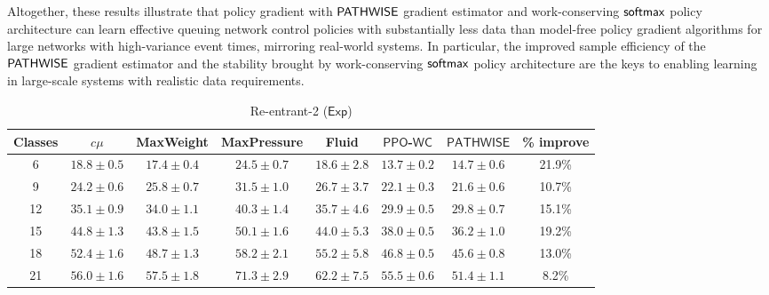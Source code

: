Altogether, these results illustrate that policy gradient with $\mathsf{PATHWISE}$ gradient estimator and work-conserving $\mathop{\mathsf{softmax}}$ policy architecture can learn effective queuing network control policies with substantially less data than model-free policy gradient algorithms for large networks with high-variance event times, mirroring real-world systems. 
In particular, the improved sample efficiency of the $\mathsf{PATHWISE}$ gradient estimator and the stability brought by work-conserving $\mathop{\mathsf{softmax}}$ policy architecture are the keys to enabling learning in large-scale systems with realistic data requirements.



\begin{table}[h!]
\centering
 \caption{Re-entrant-2 ($\mathsf{Exp}$)}%
\begin{tabular}{cccccccc}
\toprule 
{\footnotesize{}Classes} & {\footnotesize{}$c\mu$ } & {\footnotesize{}MaxWeight } & {\footnotesize{}MaxPressure} & {\footnotesize{}Fluid } & {\footnotesize{}$\mathsf{PPO}$-$\mathsf{WC}$ } & {\footnotesize{}$\mathsf{PATHWISE}$} & {\footnotesize{}\% improve}\tabularnewline
\midrule 
{\footnotesize{}6} & {\footnotesize{}$18.8\pm0.5$} & {\footnotesize{}$17.4\pm0.4$} & {\footnotesize{}$24.5\pm0.7$} & {\footnotesize{}$18.6\pm2.8$} & {\footnotesize{}$\mathbf{13.7\pm0.2}$} & {\footnotesize{}$14.7\pm0.6$} & {\footnotesize{}21.9\%}\tabularnewline
\midrule 
{\footnotesize{}9} & {\footnotesize{}$24.2\pm0.6$} & {\footnotesize{}$25.8\pm0.7$} & {\footnotesize{}$31.5\pm1.0$} & {\footnotesize{}$26.7\pm3.7$} & {\footnotesize{}$\mathbf{22.1\pm0.3}$} & {\footnotesize{}$\mathbf{21.6\pm0.6}$} & {\footnotesize{}10.7\%}\tabularnewline
\midrule 
{\footnotesize{}12 } & {\footnotesize{}$35.1\pm0.9$} & {\footnotesize{}$34.0\pm1.1$} & {\footnotesize{}$40.3\pm1.4$} & {\footnotesize{}$35.7\pm4.6$} & {\footnotesize{}$\mathbf{29.9\pm0.5}$} & {\footnotesize{}$\mathbf{29.8\pm0.7}$} & {\footnotesize{}15.1\%}\tabularnewline
\midrule 
{\footnotesize{}15 } & {\footnotesize{}$44.8\pm1.3$} & {\footnotesize{}$43.8\pm1.5$} & {\footnotesize{}$50.1\pm1.6$} & {\footnotesize{}$44.0\pm5.3$} & {\footnotesize{}$\mathbf{38.0\pm0.5}$} & {\footnotesize{}$\mathbf{36.2\pm1.0}$} & {\footnotesize{}19.2\%}\tabularnewline
\midrule 
{\footnotesize{}18 } & {\footnotesize{}$52.4\pm1.6$} & {\footnotesize{}$48.7\pm1.3$} & {\footnotesize{}$58.2\pm2.1$} & {\footnotesize{}$55.2\pm5.8$} & {\footnotesize{}$\mathbf{46.8\pm0.5}$} & {\footnotesize{}$\mathbf{45.6\pm0.8}$} & {\footnotesize{}13.0\%}\tabularnewline
\midrule 
{\footnotesize{}21 } & {\footnotesize{}$56.0\pm1.6$} & {\footnotesize{}$57.5\pm1.8$} & {\footnotesize{}$71.3\pm2.9$} & {\footnotesize{}$62.2\pm7.5$} & {\footnotesize{}$55.5\pm0.6$} & {\footnotesize{}$\mathbf{51.4\pm1.1}$} & {\footnotesize{}8.2\%}\tabularnewline

\end{tabular}
\end{table}
